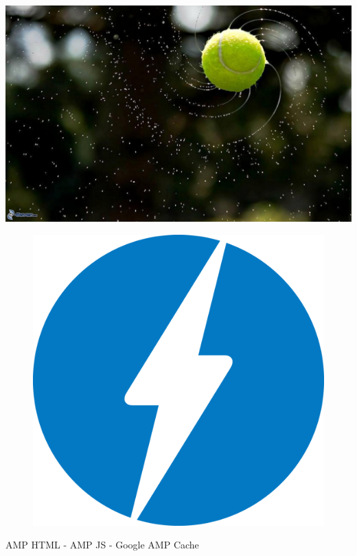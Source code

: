 \documentclass[graphic, aspectratio=169]{beamer}
\begin{document}
{\includegraphics[width=\paperwidth,height=\paperheight]{slides/images/tennis-ball.jpg}}
\begin{frame}
\end{frame}


\begin{frame}
    \begin{figure}[h!]
    \centering
    \includegraphics[scale=0.1]{images/logo-AMP.png}
    \label{fig:AMP logo}
    \end{figure}
    \begin{center}
    AMP HTML   -   AMP JS  -  Google AMP Cache
    \end{center}
\end{frame}
\end{document}
